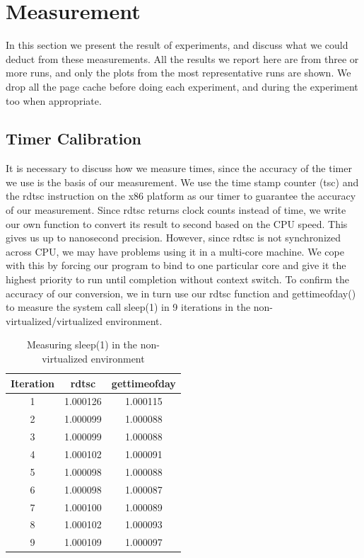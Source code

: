 \section{Measurement}
\label{section:measurement}

In this section we present the result of experiments, and discuss what we could deduct from these measurements. All the results we report here are from three or more runs, and only the plots from the most representative runs are shown. We drop all the page cache before doing each experiment, and during the experiment too when appropriate.

\subsection{Timer Calibration}
It is necessary to discuss how we measure times, since the accuracy of the timer we use is the basis of our measurement. We use the time stamp counter (tsc) and the rdtsc instruction on the x86 platform as our timer to guarantee the accuracy of our measurement. Since rdtsc returns clock counts instead of time, we write our own function to convert its result to second based on the CPU speed. This gives us up to nanosecond precision. However, since rdtsc is not synchronized across CPU, we may have problems using it in a multi-core machine. We cope with this by forcing our program to bind to one particular core and give it the highest priority to run until completion without context switch. To confirm the accuracy of our conversion, we in turn use our rdtsc function and gettimeofday() to measure the system call sleep(1) in 9 iterations in the non-virtualized/virtualized environment. 

\begin{table}[!thb]
\centering
\begin{tabular}{|c|c|c|} \hline
Iteration & rdtsc & gettimeofday \\ \hline
1 & 1.000126 & 1.000115 \\ \hline
2 & 1.000099 & 1.000088 \\ \hline
3 & 1.000099 & 1.000088 \\ \hline
4 & 1.000102 & 1.000091 \\ \hline
5 & 1.000098 & 1.000088 \\ \hline
6 & 1.000098 & 1.000087 \\ \hline
7 & 1.000100 & 1.000089 \\ \hline
8 & 1.000102 & 1.000093 \\ \hline
9 & 1.000109 & 1.000097 \\ \hline
\end{tabular}
\label{tab:cali_non_virtual}
\caption{Measuring sleep(1) in the non-virtualized environment}
\end{table}


